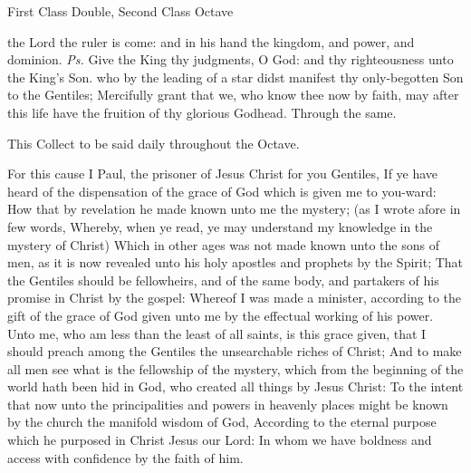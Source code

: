 \label{EpiphanyMass}
\begin{inhead}
{First Class Double, Second Class Octave}
\end{inhead}
\par\noindent
{}


\introit
{} the Lord the ruler is come: and in his hand the kingdom, and power, and dominion. \textit{Ps.} Give the King thy judgments, O God: and thy righteousness unto the King's Son.
\collect
{} who by the leading of a star didst manifest thy only-begotten Son to the Gentiles; Mercifully grant that we, who know thee now by faith, may after this life have the fruition of thy glorious Godhead. Through the same.
\begin{rubric}
    This Collect to be said daily throughout the Octave.
\end{rubric}
 For this cause I Paul, the prisoner of Jesus Christ for you Gentiles, If ye have heard of the dispensation of the grace of God which is given me to you-ward: How that by revelation he made known unto me the mystery; (as I wrote afore in few words, Whereby, when ye read, ye may understand my knowledge in the mystery of Christ) Which in other ages was not made known unto the sons of men, as it is now revealed unto his holy apostles and prophets by the Spirit; That the Gentiles should be fellowheirs, and of the same body, and partakers of his promise in Christ by the gospel: Whereof I was made a minister, according to the gift of the grace of God given unto me by the effectual working of his power. Unto me, who am less than the least of all saints, is this grace given, that I should preach among the Gentiles the unsearchable riches of Christ; And to make all men see what is the fellowship of the mystery, which from the beginning of the world hath been hid in God, who created all things by Jesus Christ: To the intent that now unto the principalities and powers in heavenly places might be known by the church the manifold wisdom of God, According to the eternal purpose which he purposed in Christ Jesus our Lord: In whom we have boldness and access with confidence by the faith of him.

